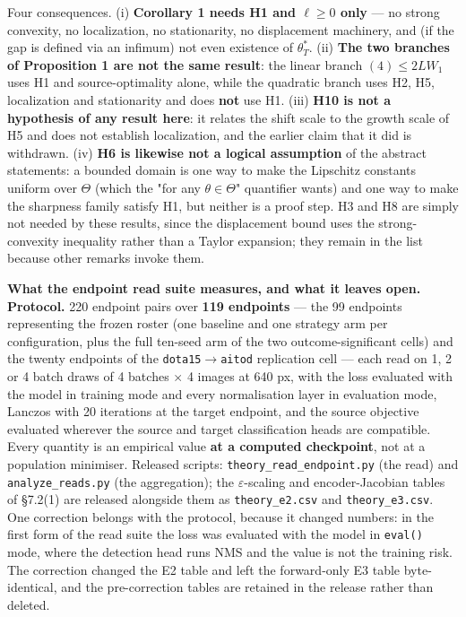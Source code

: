\documentclass[pdflatex,sn-mathphys-ay]{sn-jnl}
\begin{document}
Four consequences. (i) \textbf{Corollary 1 needs H1 and $\ell\ge0$ only} --- no strong convexity, no localization, no stationarity, no displacement machinery, and (if the gap is defined via an infimum) not even existence of $\theta^*_T$. (ii) \textbf{The two branches of Proposition 1 are not the same result}: the linear branch $(4)\le2LW_1$ uses H1 and source-optimality alone, while the quadratic branch uses H2, H5, localization and stationarity and does \textbf{not} use H1. (iii) \textbf{H10 is not a hypothesis of any result here}: it relates the shift scale to the growth scale of H5 and does not establish localization, and the earlier claim that it did is withdrawn. (iv) \textbf{H6 is likewise not a logical assumption} of the abstract statements: a bounded domain is one way to make the Lipschitz constants uniform over $\Theta$ (which the "for any $\theta\in\Theta$" quantifier wants) and one way to make the sharpness family satisfy H1, but neither is a proof step. H3 and H8 are simply not needed by these results, since the displacement bound uses the strong-convexity inequality rather than a Taylor expansion; they remain in the list because other remarks invoke them.

\textbf{What the endpoint read suite measures, and what it leaves open.} \textbf{Protocol.} 220 endpoint pairs over \textbf{119 endpoints} --- the 99 endpoints representing the frozen roster (one baseline and one strategy arm per configuration, plus the full ten-seed arm of the two outcome-significant cells) and the twenty endpoints of the \texttt{dota15\ensuremath{\rightarrow}aitod} replication cell --- each read on 1, 2 or 4 batch draws of 4 batches \ensuremath{\times} 4 images at 640 px, with the loss evaluated with the model in training mode and every normalisation layer in evaluation mode, Lanczos with 20 iterations at the target endpoint, and the source objective evaluated wherever the source and target classification heads are compatible. Every quantity is an empirical value \textbf{at a computed checkpoint}, not at a population minimiser. Released scripts: \texttt{theory\_read\_endpoint.py} (the read) and \texttt{analyze\_reads.py} (the aggregation); the \ensuremath{\varepsilon}-scaling and encoder-Jacobian tables of \S{}7.2(1) are released alongside them as \texttt{theory\_e2.csv} and \texttt{theory\_e3.csv}. One correction belongs with the protocol, because it changed numbers: in the first form of the read suite the loss was evaluated with the model in \texttt{eval()} mode, where the detection head runs NMS and the value is not the training risk. The correction changed the E2 table and left the forward-only E3 table byte-identical, and the pre-correction tables are retained in the release rather than deleted.
\end{document}
